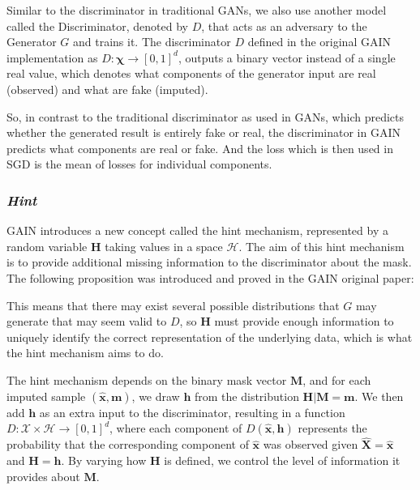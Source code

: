 Similar to the discriminator in traditional GANs, we also use another model called the Discriminator, denoted by \( D \), that acts as an adversary to the Generator \( G \) and trains it. The discriminator \( D \) defined in the original GAIN implementation as \( D : \mathbf{\chi} \rightarrow [0,1]^d \), outputs a binary vector instead of a single real value, which denotes what components of the generator input are real (observed) and what are fake (imputed). 

So, in contrast to the traditional discriminator as used in GANs, which predicts whether the generated result is entirely fake or real, the discriminator in GAIN predicts what components are real or fake. And the loss which is then used in SGD is the mean of losses for individual components.

\subsubsection{\textit{Hint}}
GAIN introduces a new concept called the hint mechanism, represented by a random variable \( \mathbf{H} \) taking values in a space \( \mathcal{H} \). The aim of this hint mechanism is to provide additional missing information to the discriminator about the mask. The following proposition was introduced and proved in the GAIN\cite{gain} original paper:


This means that there may exist several possible distributions that \( G \) may generate that may seem valid to \( D \), so \( \mathbf{H} \) must provide enough information to uniquely identify the correct representation of the underlying data, which is what the hint mechanism aims to do.

The hint mechanism depends on the binary mask vector \( \mathbf{M} \), and for each imputed sample \( (\hat{\mathbf{x}}, \mathbf{m}) \), we draw \( \mathbf{h} \) from the distribution \( \mathbf{H} | \mathbf{M} = \mathbf{m} \). We then add \( \mathbf{h} \) as an extra input to the discriminator, resulting in a function \( D: \mathcal{X} \times \mathcal{H} \rightarrow [0, 1]^d \), where each component of \( D(\hat{\mathbf{x}}, \mathbf{h}) \) represents the probability that the corresponding component of \( \hat{\mathbf{x}} \) was observed given \( \hat{\mathbf{X}} = \hat{\mathbf{x}} \) and \( \mathbf{H} = \mathbf{h} \).
By varying how \( \mathbf{H} \) is defined, we control the level of information it provides about \( \mathbf{M} \).

